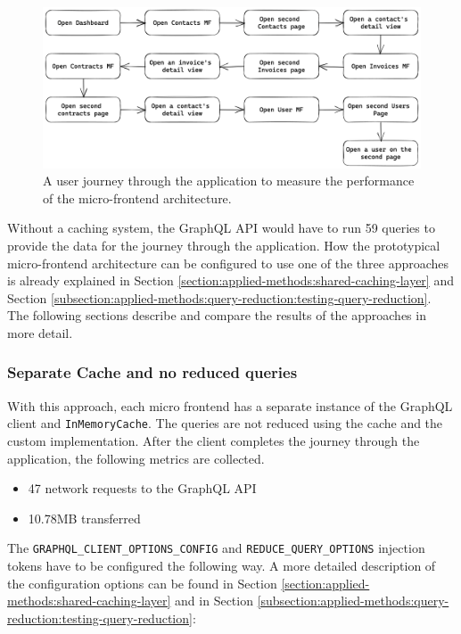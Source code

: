 \ifshowImages
\begin{figure}[H]
\centering
\includegraphics[width=1\linewidth]{images/results/evaluation-first-path.png}
\caption{A user journey through the application to measure the performance of the micro-frontend architecture.}\label{fig:results:evaluation-first-path}
\end{figure}
\fi

\noindent Without a caching system, the GraphQL \ac{API} would have to run 59 queries to provide the data for the journey through the application. How the prototypical micro-frontend architecture can be configured to use one of the three approaches is already explained in Section \ref{section:applied-methods:shared-caching-layer} and Section \ref{subsection:applied-methods:query-reduction:testing-query-reduction}. The following sections describe and compare the results of the approaches in more detail.

\subsubsection{Separate Cache and no reduced queries}\label{subsubsection:results:performance-measurement:separate-cache-no-reduction}

With this approach, each micro frontend has a separate instance of the GraphQL client and \texttt{InMemoryCache}. The queries are not reduced using the cache and the custom implementation. After the client completes the journey through the application, the following metrics are collected.

\begin{itemize}
  \item 47 network requests to the GraphQL \ac{API}
  \item 10.78MB transferred
\end{itemize}

\noindent The \texttt{GRAPHQL\_CLIENT\_OPTIONS\_CONFIG} and \texttt{REDUCE\_QUERY\_OPTIONS} injection tokens have to be configured the following way. A more detailed description of the configuration options can be found in Section \ref{section:applied-methods:shared-caching-layer} and in Section \ref{subsection:applied-methods:query-reduction:testing-query-reduction}:

